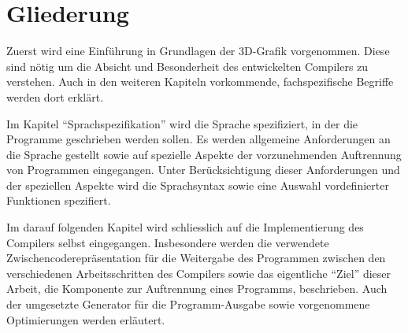 \documentclass[twoside,a4paper,fleqn,12pt]{book}
\begin{document}




\section{Gliederung}

Zuerst wird eine Einführung in Grundlagen der 3D-Grafik vorgenommen. Diese sind nötig um die Absicht und Besonderheit des entwickelten Compilers zu verstehen.
Auch in den weiteren Kapiteln vorkommende, fachspezifische Begriffe werden dort erklärt.

Im Kapitel "`Sprachspezifikation"' wird die Sprache spezifiziert, in der die Programme geschrieben werden sollen.
Es werden allgemeine Anforderungen an die Sprache gestellt sowie auf spezielle Aspekte der vorzunehmenden Auftrennung von Programmen eingegangen.
Unter Berücksichtigung dieser Anforderungen und der speziellen Aspekte wird die Sprachsyntax sowie eine Auswahl vordefinierter Funktionen spezifiert.

Im darauf folgenden Kapitel wird schliesslich auf die Implementierung des Compilers selbst eingegangen. Insbesondere werden die verwendete Zwischencoderepräsentation
für die Weitergabe des Programmen zwischen den verschiedenen Arbeitsschritten des Compilers sowie das eigentliche "`Ziel"' dieser Arbeit,
die Komponente zur Auftrennung eines Programms, beschrieben. Auch der umgesetzte Generator für die Programm-Ausgabe sowie vorgenommene Optimierungen
werden erläutert.
\end{document}
